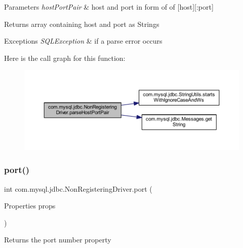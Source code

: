 \begin{DoxyParams}{Parameters}
{\em host\+Port\+Pair} & host and port in form of of \mbox{[}host\mbox{]}\mbox{[}\+:port\mbox{]}\\
\hline
\end{DoxyParams}
\begin{DoxyReturn}{Returns}
array containing host and port as Strings
\end{DoxyReturn}

\begin{DoxyExceptions}{Exceptions}
{\em S\+Q\+L\+Exception} & if a parse error occurs \\
\hline
\end{DoxyExceptions}
Here is the call graph for this function\+:
\nopagebreak
\begin{figure}[H]
\begin{center}
\leavevmode
\includegraphics[width=350pt]{classcom_1_1mysql_1_1jdbc_1_1_non_registering_driver_ac7360814a69eb287dc4c0b5f7ca06cbf_cgraph}
\end{center}
\end{figure}
\mbox{\label{classcom_1_1mysql_1_1jdbc_1_1_non_registering_driver_a90edfd44b2f276ac386d4ab31c76ace6}} 
\subsubsection{\texorpdfstring{port()}{port()}}
{\footnotesize\ttfamily int com.\+mysql.\+jdbc.\+Non\+Registering\+Driver.\+port (\begin{DoxyParamCaption}\item[{Properties}]{props }\end{DoxyParamCaption})}

Returns the port number property


